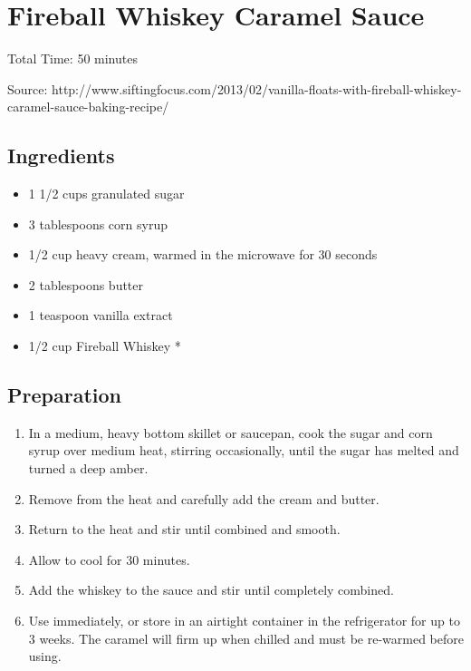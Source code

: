 \section{Fireball Whiskey Caramel Sauce}

\begin{center}
Total Time: 50 minutes

\vspace{1em}

Source: http://www.siftingfocus.com/2013/02/vanilla-floats-with-fireball-whiskey-caramel-sauce-baking-recipe/

\end{center}

\subsection{Ingredients}
\begin{itemize}
    \item 1 1/2 cups granulated sugar
    \item 3 tablespoons corn syrup
    \item 1/2 cup heavy cream, warmed in the microwave for 30 seconds
    \item 2 tablespoons butter
    \item 1 teaspoon vanilla extract
    \item 1/2 cup Fireball Whiskey *
\end{itemize}

\subsection{Preparation}
\begin{enumerate}
    \item In a medium, heavy bottom skillet or saucepan, cook the sugar and
          corn syrup over medium heat, stirring occasionally, until the sugar
          has melted and turned a deep amber.
    \item Remove from the heat and carefully add the cream and butter.
    \item Return to the heat and stir until combined and smooth.
    \item Allow to cool for 30 minutes.
    \item Add the whiskey to the sauce and stir until completely combined.
    \item Use immediately, or store in an airtight container in the refrigerator for up to 3 weeks.  The caramel will firm up when chilled and must be re-warmed before using.
\end{enumerate}

